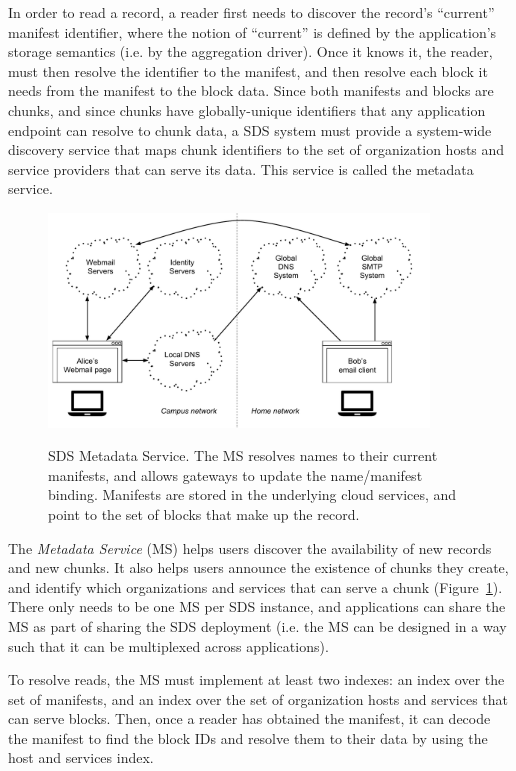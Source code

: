 In order to read a record, a reader first
needs to discover the record's ``current'' manifest identifier, where the notion
of ``current'' is defined by the application's storage semantics (i.e. by the
aggregation driver).  Once it knows it, the reader, must then resolve the
identifier to the manifest, and then resolve each block it needs from the
manifest to the block data.  Since both manifests and blocks are chunks,
and since chunks have globally-unique identifiers that any application endpoint
can resolve to chunk data, a SDS
system must provide a system-wide discovery service that maps chunk identifiers to the set of
organization hosts and service providers that can serve its data.
This service is called the metadata service.

\begin{figure}[h]
   \caption{SDS Metadata Service.  The MS resolves names to their current
   manifests, and allows gateways to update the name/manifest binding.
   Manifests are stored in the underlying cloud services, and
   point to the set of blocks that make up the record.}
   \centering
   \includegraphics[width=0.9\textwidth,page=5]{figures/dissertation-figures}
   \label{fig:chap2-metadata-service}
\end{figure}

The \emph{Metadata Service} (MS) helps users discover the
availability of new records and new chunks.  It also helps users
announce the existence of chunks they create, and
identify which organizations and services that can serve a chunk
(Figure~\ref{fig:chap2-metadata-service}).
There only needs to be one MS per SDS instance, and
applications can share the MS as part of sharing the SDS deployment (i.e. the MS
can be designed in a way such that it can be multiplexed across applications).

To resolve reads, the MS must implement at least two indexes:
an index over the set of manifests, and an index over the set of organization
hosts and services that can serve blocks.  Then, once a reader has obtained the
manifest, it can decode the manifest to find the block IDs and resolve them to
their data by using the host and services index.

